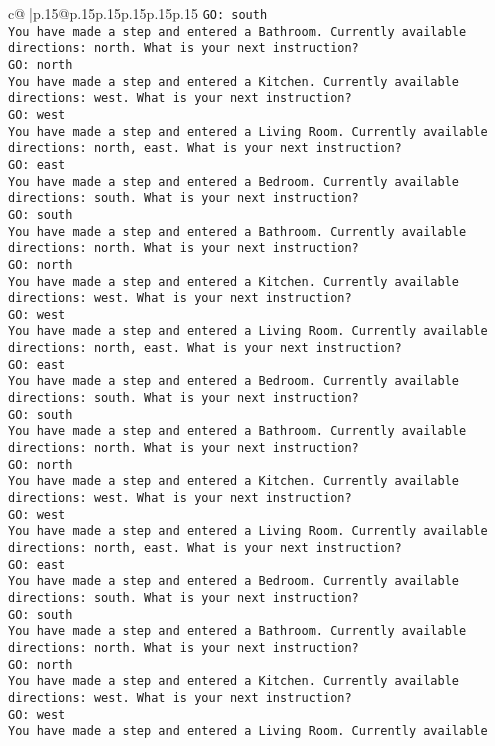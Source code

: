 \documentclass{article}
\begin{document}
{\begin{supertabular}{c@{$\;$}|p{.15\linewidth}@{}p{.15\linewidth}p{.15\linewidth}p{.15\linewidth}p{.15\linewidth}p{.15\linewidth}}
{{{\tt GO: south\\ \tt You have made a step and entered a Bathroom. Currently available directions: north. What is your next instruction?\\ \tt GO: north\\ \tt You have made a step and entered a Kitchen. Currently available directions: west. What is your next instruction?\\ \tt GO: west\\ \tt You have made a step and entered a Living Room. Currently available directions: north, east. What is your next instruction?\\ \tt GO: east\\ \tt You have made a step and entered a Bedroom. Currently available directions: south. What is your next instruction?\\ \tt GO: south\\ \tt You have made a step and entered a Bathroom. Currently available directions: north. What is your next instruction?\\ \tt GO: north\\ \tt You have made a step and entered a Kitchen. Currently available directions: west. What is your next instruction?\\ \tt GO: west\\ \tt You have made a step and entered a Living Room. Currently available directions: north, east. What is your next instruction?\\ \tt GO: east\\ \tt You have made a step and entered a Bedroom. Currently available directions: south. What is your next instruction?\\ \tt GO: south\\ \tt You have made a step and entered a Bathroom. Currently available directions: north. What is your next instruction?\\ \tt GO: north\\ \tt You have made a step and entered a Kitchen. Currently available directions: west. What is your next instruction?\\ \tt GO: west\\ \tt You have made a step and entered a Living Room. Currently available directions: north, east. What is your next instruction?\\ \tt GO: east\\ \tt You have made a step and entered a Bedroom. Currently available directions: south. What is your next instruction?\\ \tt GO: south\\ \tt You have made a step and entered a Bathroom. Currently available directions: north. What is your next instruction?\\ \tt GO: north\\ \tt You have made a step and entered a Kitchen. Currently available directions: west. What is your next instruction?\\ \tt GO: west\\ \tt You have made a step and entered a Living Room. Currently available }}}
\end{supertabular}}
\end{document}
